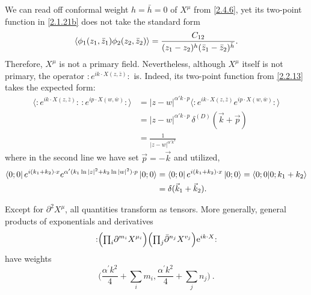 \begin{tcolorbox}[breakable]
	\begin{remark}
		We can read off conformal weight $h=\bar{h}=0$ of $X^{\mu}$ from \eqref{2.4.6}, yet its two-point function in \eqref{2.1.21b} does not take the standard form
		\begin{align*}
			\ev{\phi_1(z_1,\bar z_1)\phi_2(z_2,\bar{z}_2)}=\frac{C_{12}}{(z_1-z_2)^{h}(\bar{z}_1-\bar{z}_2)^{\bar{h}}}.
		\end{align*}
		Therefore, $X^{\mu}$ is not a primary field. Nevertheless, although $X^{\mu}$ itself is not primary, the operator $:e^{ik\cdot X(z,\bar z)}:$ is. Indeed, its two-point function from \eqref{2.2.13} takes the expected form:
		\begin{align}
			\big\langle :e^{ik\cdot X(z,\bar z)}:\, :e^{ip\cdot X(w,\bar w)}:\big\rangle&=|z-w|^{\alpha' k\cdot p}\big\langle :e^{ik\cdot X(z,\bar z)}e^{ip\cdot X(w,\bar w)}:\big\rangle\nonumber\\
			&= |z-w|^{\alpha' k\cdot p} \, \delta^{(D)}(\vec k+\vec p)\nonumber \\
			&= \frac{1}{|z-w|^{\alpha' k^2}}
		\end{align}
		where in the second line we have set $\vec p=-\vec k$ and utilized,
		\begin{align*}
			\bra{0;0}e^{i(k_1+k_2)\cdot x}e^{\alpha'(k_1\ln|z|^2+k_2\ln|w|^2)\cdot p}\ket{0;0}&=\bra{0;0}e^{i(k_1+k_2)\cdot x}\ket{0;0}=\braket{0;0}{0;k_1+k_2}\nonumber\\
			&=\delta(\vec{k}_1+\vec{k}_2).
		\end{align*}
	\end{remark}
\end{tcolorbox}
Except for $\partial^{2} X^{\mu}$, all quantities transform as tensors. More generally, general products of exponentials and derivatives    
\begin{equation}
	:\mathrel{\Bigl({\textstyle \prod_{i}} \partial^{m_{i}} X^{\mu_{i}}\Bigr)\Bigl({\textstyle \prod_{j}} \bar{\partial}^{n_{j}} X^{v_{j}}\Bigr) \mathrm{e}^{i k \cdot X} }:
\end{equation}
have weights    
\begin{equation}
	\biggl(\frac{\alpha^{\prime} k^{2}}{4}+ {\textstyle\sum_{i}} m_{i}, \frac{\alpha^{\prime} k^{2}}{4}+\textstyle{\sum_{j}} n_{j}\biggr) \:.
	\label{2.4.19}
\end{equation}

